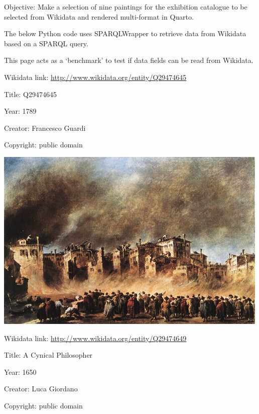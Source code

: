 \documentclass[
  letterpaper,
]{book}
\begin{document}
Objective: Make a selection of nine paintings for the exhibition
catalogue to be selected from Wikidata and rendered multi-format in
Quarto.

The below Python code uses SPARQLWrapper to retrieve data from Wikidata
based on a SPARQL query.

This page acts as a `benchmark' to test if data fields can be read from
Wikidata.

Wikidata link: \url{http://www.wikidata.org/entity/Q29474645}

Title: Q29474645

Year: 1789

Creator: Francesco Guardi

Copyright: public domain

\includegraphics{painting-collection_files/figure-pdf/cell-2-output-2.png}

Wikidata link: \url{http://www.wikidata.org/entity/Q29474649}

Title: A Cynical Philosopher

Year: 1650

Creator: Luca Giordano

Copyright: public domain
\end{document}
